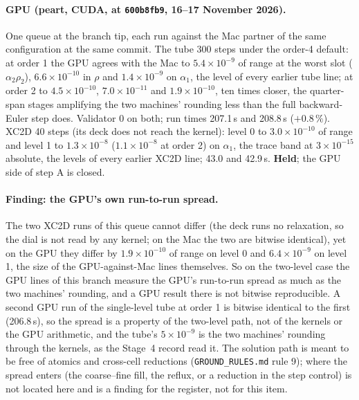 \documentclass[11pt,a4paper]{article}
\newcommand{\code}[1]{\texttt{\small #1}}
\begin{document}
\paragraph{GPU (peart, CUDA, at \code{600b8fb9}, 16--17 November 2026).}
One queue at the branch tip, each run against the Mac partner of the
same configuration at the same commit.  The tube 300 steps under the
order-4 default: at order 1 the GPU agrees with the Mac to
$5.4\times10^{-9}$ of range at the worst slot ($\alpha_2\rho_2$),
$6.6\times10^{-10}$ in $\rho$ and $1.4\times10^{-9}$ on $\alpha_1$,
the level of every earlier tube line; at order 2 to $4.5\times10^{-10}$,
$7.0\times10^{-11}$ and $1.9\times10^{-10}$, ten times closer, the
quarter-span stages amplifying the two machines' rounding less than the
full backward-Euler step does.  Validator 0 on both; run times 207.1\,s
and 208.8\,s ($+0.8\,\%$).  XC2D 40 steps (its deck does not reach the
kernel): level 0 to $3.0\times10^{-10}$ of range and level 1 to
$1.3\times10^{-8}$ ($1.1\times10^{-8}$ at order 2) on $\alpha_1$, the
trace band at $3\times10^{-15}$ absolute, the levels of every earlier
XC2D line; 43.0 and 42.9\,s.  \textbf{Held}; the GPU side of step A is
closed.

\paragraph{Finding: the GPU's own run-to-run spread.}  The two XC2D
runs of this queue cannot differ (the deck runs no relaxation, so the
dial is not read by any kernel; on the Mac the two are bitwise
identical), yet on the GPU they differ by $1.9\times10^{-10}$ of range
on level 0 and $6.4\times10^{-9}$ on level 1, the size of the
GPU-against-Mac lines themselves.  So on the two-level case the GPU
lines of this branch measure the GPU's run-to-run spread as much as
the two machines' rounding, and a GPU result there is not bitwise
reproducible.  A second GPU run of the single-level tube at order 1 is bitwise identical to the first (206.8\,s), so the spread is a property of the two-level path, not of the kernels or the GPU arithmetic, and the tube's $5\times10^{-9}$ is the two machines' rounding through the kernels, as the Stage~4 record read it.  The solution path
is meant to be free of atomics and cross-cell reductions
(\code{GROUND\_RULES.md} rule 9); where the spread enters (the
coarse--fine fill, the reflux, or a reduction in the step control) is
not located here and is a finding for the register, not for this item.
\end{document}
